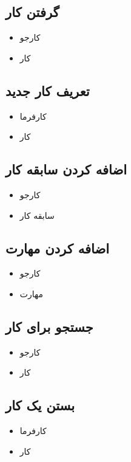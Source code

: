 \documentclass{article}
\begin{document}
\subsection{گرفتن کار}
 \begin{itemize}
 	        \item کارجو
 	\item کار
\end{itemize}
\subsection{تعریف کار جدید}
\begin{itemize}
        \item کارفرما
\item کار
\end{itemize}
\subsection{اضافه کردن سابقه کار}
\begin{itemize}
                \item کارجو
\item سابقه کار

\end{itemize}
\subsection{اضافه کردن مهارت}
\begin{itemize}
                        \item کارجو
\item مهارت

\end{itemize}
\subsection{جستجو برای کار }
		\begin{itemize}
			                \item کارجو
			\item  کار
		\end{itemize}
\subsection{بستن یک کار}
\begin{itemize}
	\item کارفرما
	\item کار
\end{itemize}
\end{document}

